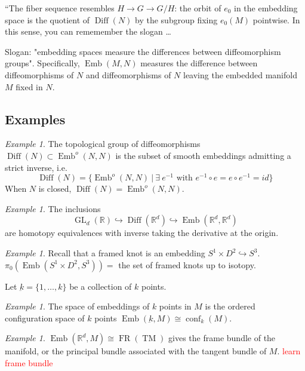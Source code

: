 \documentclass{amsart}
\DeclareMathOperator{\Emb}{Emb}
\DeclareMathOperator{\Diff}{Diff}
\DeclareMathOperator{\GL}{GL}
\DeclareMathOperator{\conf}{conf}
\DeclareMathOperator{\FR}{FR}
\DeclareMathOperator{\TM}{TM}
\theoremstyle{definition}
\theoremstyle{remark}
\theoremstyle{example}
\newtheorem{example}[theorem]{Example}
\begin{document}
“The fiber sequence resembles $H\to G\to G/H$: the orbit of $e_0$ in the embedding space is the quotient of $\operatorname{Diff}(N)$ by the subgroup fixing $e_0(M)$ pointwise. In this sense, you can rememember the slogan \dots

Slogan: "embedding spaces measure the differences between diffeomorphism groups". Specifically, $\Emb(M,N)$ measures the difference between diffeomorphisms of $N$ and diffeomorphisms of $N$ leaving the embedded manifold $M$ fixed in $N$.

\subsection{Examples}

\begin{example}
    The topological group of diffeomorphisms $\Diff(N) \subset \Emb^o(N,N)$ is the subset of smooth embeddings admitting a strict inverse, i.e.
    \[
    \Diff(N) = \{ \Emb^o(N,N) \ | \ \exists \ e^{-1} \text{ with } e^{-1} \circ e = e \circ e^{-1} = id \}
    \]
    When $N$ is closed, $\Diff(N) = \Emb^o(N,N)$.
\end{example}

\begin{example}
    The inclusions 
    \[
    \GL_d(\mathbb{R}) \hookrightarrow \Diff(\mathbb{R}^d) \hookrightarrow \Emb(\mathbb{R}^d, \mathbb{R}^d)
    \]
    are homotopy equivalences with inverse taking the derivative at the origin.
\end{example}

\begin{example}
    Recall that a framed knot is an embedding $S^1 \times D^2 \hookrightarrow S^3$. $\pi_0(\Emb(S^1 \times D^2, S^3)) = $ the set of framed knots up to isotopy.
\end{example}

Let $\underbar{k} = \{1, \dots, k\}$ be a collection of $k$ points.

\begin{example}
    The space of embeddings of $k$ points in $M$ is the ordered configuration space of $k$ points $\Emb(\underbar{k}, M) \cong \conf_k(M)$.
\end{example}

\begin{example}
    $\Emb(\mathbb{R}^d, M) \cong \FR(\TM)$ gives the frame bundle of the manifold, or the principal bundle associated with the tangent bundle of $M$. \textcolor{red}{learn frame bundle}
\end{example}
\end{document}
